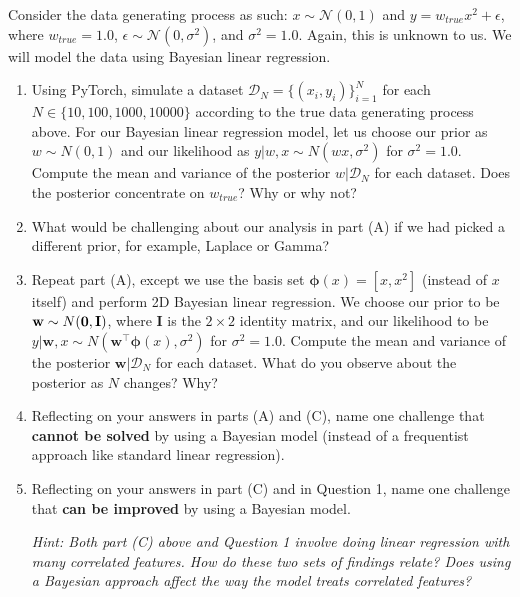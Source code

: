 \documentclass[11pt]{article}
\begin{document}
Consider the data generating process as such: $x \sim \mathcal{N}(0,1)$ and $y = w_{true} x^2 + \epsilon$, where $w_{true}=1.0$, $\epsilon \sim \mathcal{N}(0,\sigma^2)$, and $\sigma^2=1.0$. Again, this is unknown to us. We will model the data using Bayesian linear regression.

\begin{enumerate}[label=(\Alph*)]

    \item Using PyTorch, simulate a dataset $\mathcal{D}_N = \{(x_i,y_i)\}^N_{i=1}$ for each $N \in \{10,100,1000, 10000\}$ according to the true data generating process above. For our Bayesian linear regression model, let us choose our prior as $w \sim N(0,1)$ and our likelihood as $y|w,x \sim N(wx,\sigma^2)$ for $\sigma^2=1.0$. Compute the mean and variance of the posterior $w|\mathcal{D}_N$ for each dataset. Does the posterior concentrate on $w_{true}$? Why or why not?

    \item What would be challenging about our analysis in part (A) if we had picked a different prior, for example, Laplace or Gamma?

    \item Repeat part (A), except we use the basis set $\bm{\phi}(x)=[x,x^2]$ (instead of $x$ itself) and perform 2D Bayesian linear regression. We choose our prior to be ${\mathbf w} \sim N(\mathbf{0},\mathbf{I})$, where $\mathbf{I}$ is the $2 \times 2$ identity matrix, and our likelihood to be $y|\mathbf{w},x \sim N(\mathbf{w}^\top \bm{\phi}(x), \sigma^2)$ for $\sigma^2=1.0$. Compute the mean and variance of the posterior $\mathbf{w}|\mathcal{D}_N$ for each dataset. What do you observe about the posterior as $N$ changes? Why?

    \item Reflecting on your answers in parts (A) and (C), name one challenge that \textbf{cannot be solved} by using a Bayesian model (instead of a frequentist approach like standard linear regression).

    \item Reflecting on your answers in part (C) and in Question 1, name one challenge that \textbf{can be improved} by using a Bayesian model.

    \textit{Hint: Both part (C) above and Question 1 involve doing linear regression with many correlated features. How do these two sets of findings relate? Does using a Bayesian approach affect the way the model treats correlated features?}

\end{enumerate}
\end{document}
